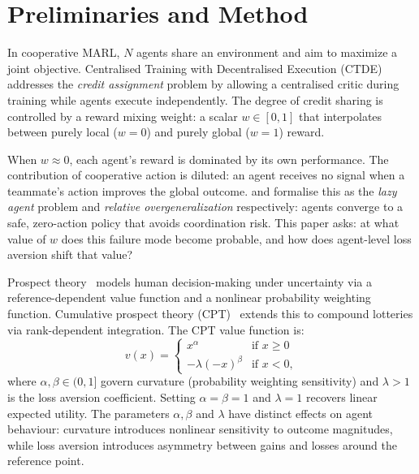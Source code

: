 \documentclass[letterpaper]{article}
\theoremstyle{plain}
\begin{document}
\section{Preliminaries and Method}
\label{sec:background}

In cooperative MARL, $N$ agents share an environment and aim to maximize a
joint objective.
Centralised Training with Decentralised Execution
(CTDE)~\citep{lowe2017multi} addresses the \emph{credit assignment}
problem by allowing a centralised critic during training while agents
execute independently.
The degree of credit sharing is controlled by a reward mixing weight:
a scalar $w \in [0,1]$ that interpolates between purely local ($w{=}0$)
and purely global ($w{=}1$) reward.

When $w \approx 0$, each agent's reward is dominated by its own
performance.
The contribution of cooperative action is diluted: an agent receives no
signal when a teammate's action improves the global outcome.
\citet{liu2023lazy} and \citet{peng2023curo} formalise this as the
\emph{lazy agent} problem and \emph{relative overgeneralization}
respectively: agents converge to a safe, zero-action policy that avoids
coordination risk.
This paper asks: at what value of $w$ does this failure mode become
probable, and how does agent-level loss aversion shift that value?

Prospect theory~\citep{kahneman1979} models human decision-making under
uncertainty via a reference-dependent value function and a nonlinear
probability weighting function.
Cumulative prospect theory (CPT)~\citep{tversky1992} extends this to
compound lotteries via rank-dependent integration.
The CPT value function is:
\begin{equation}
  v(x) =
  \begin{cases}
    x^{\alpha} & \text{if } x \geq 0 \\
    -\lambda(-x)^{\beta} & \text{if } x < 0,
  \end{cases}
  \label{eq:cpt}
\end{equation}
where $\alpha, \beta \in (0,1]$ govern curvature (probability weighting
sensitivity) and $\lambda > 1$ is the loss aversion coefficient.
Setting $\alpha{=}\beta{=}1$ and $\lambda{=}1$ recovers linear expected
utility.
The parameters $\alpha, \beta$ and $\lambda$ have distinct effects on
agent behaviour: curvature introduces nonlinear sensitivity to outcome
magnitudes, while loss aversion introduces asymmetry between gains and
losses around the reference point.
\end{document}
